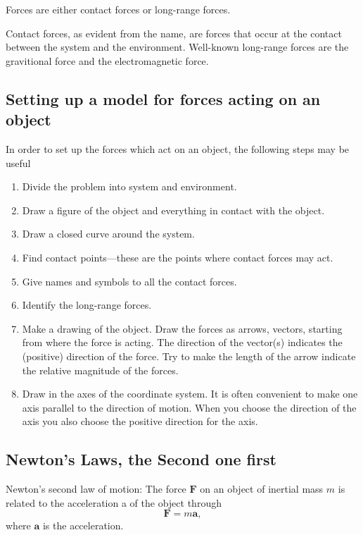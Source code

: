 \documentclass[%
oneside,                 %
final,                   %
10pt]{article}
\begin{document}
Forces are either contact forces or long-range forces.

Contact forces, as evident from the name, are forces that occur at the contact between
the system and the environment. Well-known long-range forces are the gravitional force and the electromagnetic force.

\subsection*{Setting up a model for forces acting on an object}

In order to set up the forces which act on an object, the following steps may be useful
\begin{enumerate}
\item Divide the problem into system and environment.

\item Draw a figure of the object and everything in contact with the object.

\item Draw a closed curve around the system.

\item Find contact points—these are the points where contact forces may act.

\item Give names and symbols to all the contact forces.

\item Identify the long-range forces.

\item Make a drawing of the object. Draw the forces as arrows, vectors, starting from where the force is acting. The direction of the vector(s) indicates the (positive) direction of the force. Try to make the length of the arrow indicate the relative magnitude of the forces.

\item Draw in the axes of the coordinate system. It is often convenient to make one axis parallel to the direction of motion. When you choose the direction of the axis you also choose the positive direction for the axis.
\end{enumerate}

\noindent
\subsection*{Newton's Laws, the Second one first}

Newton’s second law of motion: The force $\bm{F}$ on an object of inertial mass $m$
is related to the acceleration a of the object through
\[
\bm{F} = m\bm{a},
\]
where $\bm{a}$ is the acceleration.
\end{document}
